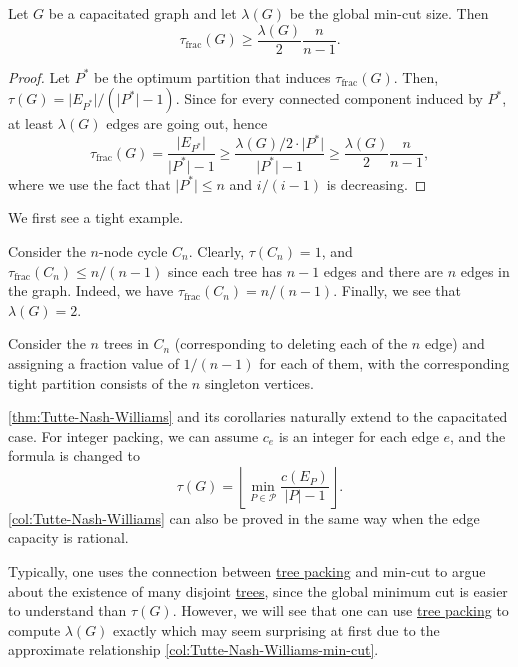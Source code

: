 \begin{corollary}\label{col:Tutte-Nash-Williams-min-cut}
	Let \(G\) be a capacitated graph and let \(\lambda (G)\) be the global min-cut size. Then
	\[
		\tau _{\text{frac} }(G)
		\geq \frac{\lambda (G)}{2} \frac{n}{n - 1}.
	\]
\end{corollary}
\begin{proof}
	Let \(P^{\ast} \) be the optimum partition that induces \(\tau _{\text{frac} }(G)\). Then, \(\tau (G) = \lvert E_{P^{\ast} } \rvert / (\lvert P^{\ast} \rvert - 1)\). Since for every connected component induced by \(P^{\ast} \), at least \(\lambda (G)\) edges are going out, hence
	\[
		\tau _{\text{frac} }(G)
		= \frac{\lvert E_{P^{\ast} } \rvert }{\lvert P^{\ast}  \rvert - 1}
		\geq \frac{\lambda (G) / 2 \cdot \lvert P^{\ast} \rvert }{\lvert P^{\ast} \rvert - 1}
		\geq \frac{\lambda (G)}{2} \frac{n}{n-1},
	\]
	where we use the fact that \(\lvert P^{\ast} \rvert \leq n\) and \(i / (i - 1)\) is decreasing.
\end{proof}

We first see a tight example.

\begin{eg}[Cycle]
	Consider the \(n\)-node cycle \(C_n\). Clearly, \(\tau (C_n) = 1\), and \(\tau _{\text{frac} }(C_n) \leq n / (n-1)\) since each tree has \(n-1\) edges and there are \(n\) edges in the graph. Indeed, we have \(\tau _{\text{frac} } (C_n) = n / (n-1)\). Finally, we see that \(\lambda (G) = 2\).
\end{eg}
\begin{explanation}
	Consider the \(n\) trees in \(C_n\) (corresponding to deleting each of the \(n\) edge) and assigning a fraction value of \(1 / (n-1)\) for each of them, with the corresponding tight partition consists of the \(n\) singleton vertices.
\end{explanation}

\begin{note}
	\autoref{thm:Tutte-Nash-Williams} and its corollaries naturally extend to the capacitated case. For integer packing, we can assume \(c_e\) is an integer for each edge \(e\), and the formula is changed to
	\[
		\tau (G)
		= \left\lfloor \min _{P \in \mathcal{P} } \frac{c(E_P)}{\lvert P \rvert - 1} \right\rfloor .
	\]
	\autoref{col:Tutte-Nash-Williams} can also be proved in the same way when the edge capacity is rational.
\end{note}

Typically, one uses the connection between \hyperref[prb:TP]{tree packing} and min-cut to argue about the existence of many disjoint \hyperref[def:spanning-tree]{trees}, since the global minimum cut is easier to understand than \(\tau (G)\). However, we will see that one can use \hyperref[prb:TP]{tree packing} to compute \(\lambda (G)\) exactly which may seem surprising at first due to the approximate relationship \autoref{col:Tutte-Nash-Williams-min-cut}.


